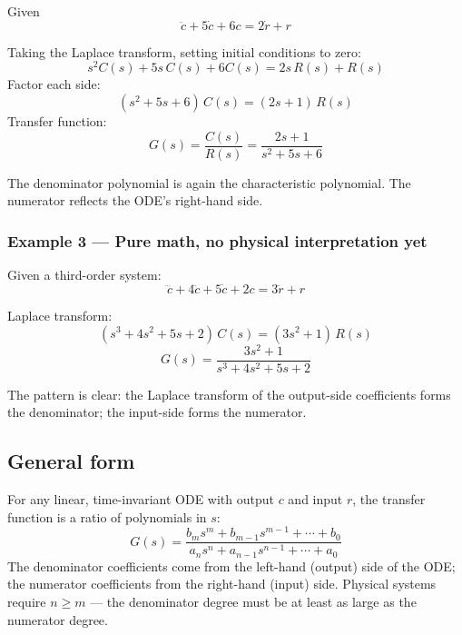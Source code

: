 \documentclass[12pt]{article}
\begin{document}
Given
\begin{equation}
  \ddot{c} + 5\dot{c} + 6c = 2\dot{r} + r
  \label{eq:ex2_ode}
\end{equation}

Taking the Laplace transform, setting initial conditions to zero:
\[
  s^2 C(s) + 5s\,C(s) + 6C(s) = 2s\,R(s) + R(s)
\]
Factor each side:
\[
  (s^2 + 5s + 6)\,C(s) = (2s + 1)\,R(s)
\]
Transfer function:
\begin{equation}
  G(s) = \frac{C(s)}{R(s)} = \frac{2s + 1}{s^2 + 5s + 6}
  \label{eq:ex2_tf}
\end{equation}

The denominator polynomial is again the characteristic polynomial.  The
numerator reflects the ODE's right-hand side.

\subsubsection*{Example 3 --- Pure math, no physical interpretation yet}

Given a third-order system:
\[
  \dddot{c} + 4\ddot{c} + 5\dot{c} + 2c = 3\ddot{r} + r
\]

Laplace transform:
\[
  (s^3 + 4s^2 + 5s + 2)\,C(s) = (3s^2 + 1)\,R(s)
\]
\begin{equation}
  G(s) = \frac{3s^2 + 1}{s^3 + 4s^2 + 5s + 2}
  \label{eq:ex3_tf}
\end{equation}

The pattern is clear: the Laplace transform of the output-side coefficients
forms the denominator; the input-side forms the numerator.

\subsection{General form}
\label{sec:tf_general}

For any linear, time-invariant ODE with output $c$ and input $r$, the
transfer function is a ratio of polynomials in $s$:
\begin{equation}
  G(s) = \frac{b_m s^m + b_{m-1}s^{m-1} + \cdots + b_0}
              {a_n s^n + a_{n-1}s^{n-1} + \cdots + a_0}
  \label{eq:tf_general}
\end{equation}
The denominator coefficients come from the left-hand (output) side of the ODE;
the numerator coefficients from the right-hand (input) side.  Physical systems
require $n \geq m$ --- the denominator degree must be at least as large as the
numerator degree.
\end{document}
